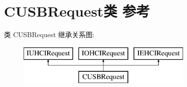 \hypertarget{class_c_u_s_b_request}{}\section{C\+U\+S\+B\+Request类 参考}
\label{class_c_u_s_b_request}
类 C\+U\+S\+B\+Request 继承关系图\+:\begin{figure}[H]
\begin{center}
\leavevmode
\includegraphics[height=2.000000cm]{class_c_u_s_b_request}
\end{center}
\end{figure}
